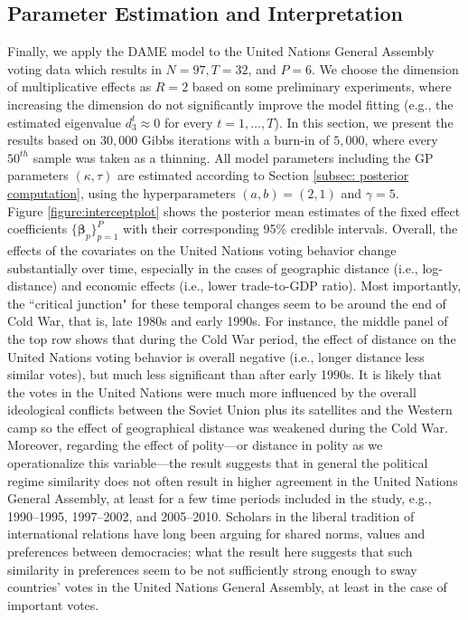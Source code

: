\documentclass[a4paper]{article}
\begin{document}
\subsection{Parameter Estimation and Interpretation}\label{subsec: UNresult}
Finally, we apply the DAME model to the United Nations General Assembly voting data which results in $N=97, T = 32$, and $P =6$. We choose the dimension of multiplicative effects as $R=2$ based on some preliminary experiments, where increasing the dimension do not significantly improve the model fitting (e.g., the estimated eigenvalue $d^t_{3}\approx 0$ for every $t=1,\ldots,T$). In this section, we present the results based on $30,000$ Gibbs iterations with a burn-in of $5,000$, where every $50^{th}$ sample was taken as a thinning. All model parameters including the GP parameters $(\kappa, \tau)$ are estimated according to Section \ref{subsec: posterior computation}, using the hyperparameters $(a, b) = (2, 1)$ and $\gamma = 5$. \\ \newline
Figure \ref{figure:interceptplot} shows the posterior mean estimates of the fixed effect coefficients $\{\boldsymbol{\beta}_p\}_{p=1}^P$ with their corresponding 95\% credible intervals. Overall, the effects of the covariates on the United Nations voting behavior change substantially over time, especially in the cases of geographic distance (i.e., log-distance) and economic effects (i.e., lower trade-to-GDP ratio). Most importantly, the ``critical junction" for these temporal changes seem to be around the end of Cold War, that is, late 1980s and early 1990s. For instance, the middle panel of the top row shows that during the Cold War period, the effect of distance on the United Nations voting behavior is overall negative (i.e., longer distance less similar votes), but much less significant than after early 1990s. It is likely that the votes in the United Nations were much more influenced by the overall ideological conflicts between the Soviet Union plus its satellites and the Western camp so the effect of geographical distance was weakened during the Cold War. Moreover, regarding the effect of polity---or distance in polity as we operationalize this variable---the result suggests that in general the political regime similarity does not often result in higher agreement in the United Nations General Assembly, at least for a few time periods included in the study, e.g., 1990--1995, 1997--2002, and 2005--2010. Scholars in the liberal tradition of international relations have long been arguing for shared norms, values and preferences between democracies; what the result here suggests that such similarity in preferences seem to be not sufficiently strong enough to sway countries' votes in the United Nations General Assembly, at least in the case of important votes.\\
\end{document}
